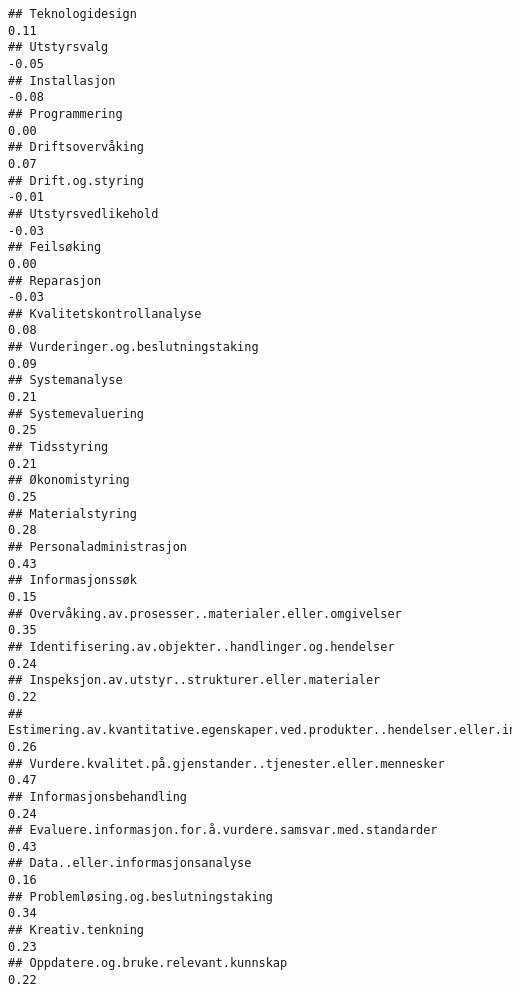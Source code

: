 \documentclass[
]{article}
\begin{document}
\begin{verbatim}
## Teknologidesign                                                                   0.11
## Utstyrsvalg                                                                      -0.05
## Installasjon                                                                     -0.08
## Programmering                                                                     0.00
## Driftsovervåking                                                                  0.07
## Drift.og.styring                                                                 -0.01
## Utstyrsvedlikehold                                                               -0.03
## Feilsøking                                                                        0.00
## Reparasjon                                                                       -0.03
## Kvalitetskontrollanalyse                                                          0.08
## Vurderinger.og.beslutningstaking                                                  0.09
## Systemanalyse                                                                     0.21
## Systemevaluering                                                                  0.25
## Tidsstyring                                                                       0.21
## Økonomistyring                                                                    0.25
## Materialstyring                                                                   0.28
## Personaladministrasjon                                                            0.43
## Informasjonssøk                                                                   0.15
## Overvåking.av.prosesser..materialer.eller.omgivelser                              0.35
## Identifisering.av.objekter..handlinger.og.hendelser                               0.24
## Inspeksjon.av.utstyr..strukturer.eller.materialer                                 0.22
## Estimering.av.kvantitative.egenskaper.ved.produkter..hendelser.eller.informasjon  0.26
## Vurdere.kvalitet.på.gjenstander..tjenester.eller.mennesker                        0.47
## Informasjonsbehandling                                                            0.24
## Evaluere.informasjon.for.å.vurdere.samsvar.med.standarder                         0.43
## Data..eller.informasjonsanalyse                                                   0.16
## Problemløsing.og.beslutningstaking                                                0.34
## Kreativ.tenkning                                                                  0.23
## Oppdatere.og.bruke.relevant.kunnskap                                              0.22

\end{verbatim}
\end{document}
